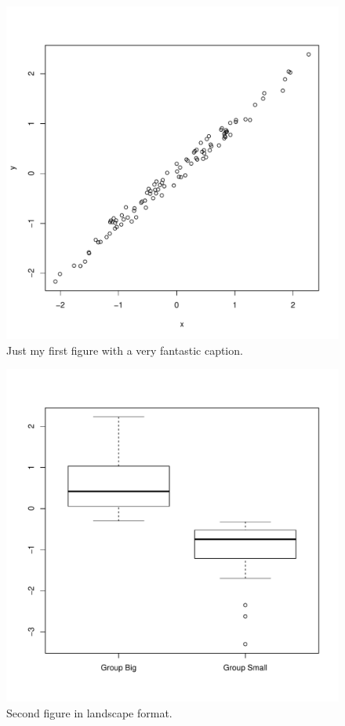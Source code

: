 \documentclass[11pt,a4paper]{article}
\newcommand{\blandscape}{\begin{landscape}}
\newcommand{\elandscape}{\end{landscape}}
\begin{document}
\begin{figure}
\centering
\includegraphics{figures/Fig1-1.pdf}
\caption{Just my first figure with a very fantastic caption.}
\end{figure}

\newpage

\blandscape

\begin{figure}
\centering
\includegraphics{figures/Fig2-1.pdf}
\caption{Second figure in landscape format.}
\end{figure}

\elandscape

\clearpage
\end{document}
